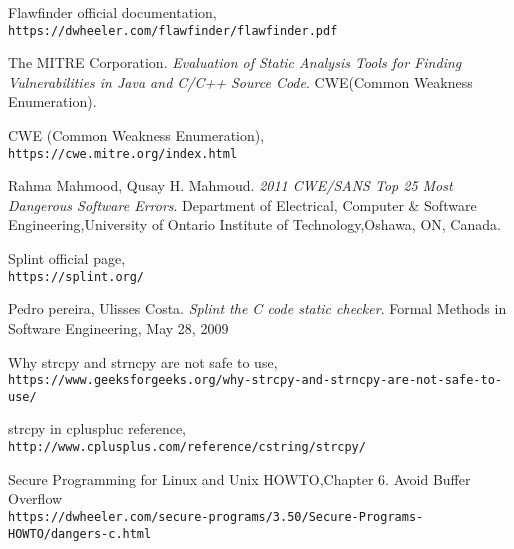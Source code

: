 \documentclass[a4paper,12pt]{article}
\begin{document}



\begin{thebibliography}{}

   Flawfinder official documentation,\\\texttt{https://dwheeler.com/flawfinder/flawfinder.pdf}

The MITRE Corporation.
\textit{Evaluation of Static Analysis Tools for Finding Vulnerabilities in Java and C/C++
Source Code}.
CWE(Common
Weakness Enumeration)\cite{CWE}.

  CWE (Common
Weakness Enumeration),\\\texttt{https://cwe.mitre.org/index.html}

  
Rahma Mahmood, Qusay H. Mahmoud.
\textit{2011 CWE/SANS Top 25 Most Dangerous Software Errors}.
Department of Electrical, Computer \& Software Engineering,University of Ontario Institute of Technology,Oshawa, ON, Canada.

 Splint official page,\\\texttt{https://splint.org/}    

Pedro pereira, Ulisses Costa.
\textit{Splint the C code static checker}.
Formal Methods in Software Engineering, May 28, 2009

Why strcpy and strncpy are not safe to use,\\\texttt{https://www.geeksforgeeks.org/why-strcpy-and-strncpy-are-not-safe-to-use/}


strcpy in cpluspluc reference,\\\texttt{http://www.cplusplus.com/reference/cstring/strcpy/}

Secure Programming for Linux and Unix HOWTO,Chapter 6. Avoid Buffer Overflow\\\texttt{https://dwheeler.com/secure-programs/3.50/Secure-Programs-HOWTO/dangers-c.html}

\end{thebibliography}
\end{document}
